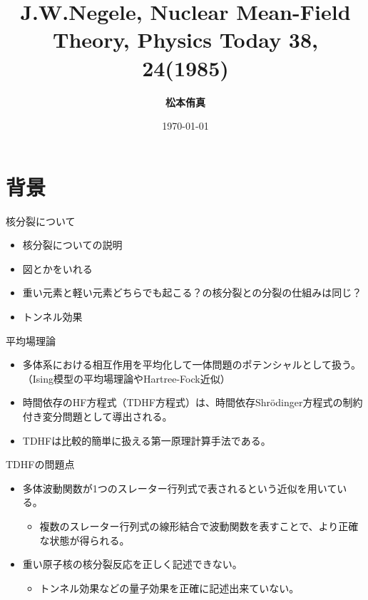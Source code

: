 \documentclass[14pt,aspectratio=169,xcolor=dvipsnames,table,dvipdfmx]{beamer}
\title{J.W.Negele, Nuclear Mean-Field Theory, Physics Today 38, 24(1985)}
\author{\textbf{松本侑真}}
\date{\today}
\institute{}
\theoremstyle{definition}
\begin{document}
\maketitle
\frame{\tableofcontents[hideallsubsections]}

\section{背景}
\begin{frame}{核分裂について}
  \begin{itemize}
    \item 核分裂についての説明
    \item 図とかをいれる
    \item 重い元素と軽い元素どちらでも起こる？の核分裂との分裂の仕組みは同じ？
    \item トンネル効果
  \end{itemize}
\end{frame}

\begin{frame}{平均場理論}
  \begin{itemize}
    \item 多体系における相互作用を平均化して一体問題のポテンシャルとして扱う。（Ising模型の平均場理論やHartree-Fock近似）
    \item 時間依存のHF方程式（TDHF方程式）は、時間依存Shr\"{o}dinger方程式の制約付き変分問題として導出される。
    \item TDHFは比較的簡単に扱える第一原理計算手法である。
  \end{itemize}
  \begin{block}{TDHFの問題点}
    \begin{itemize}
      \item 多体波動関数が1つのスレーター行列式で表されるという近似を用いている。
            \begin{itemize}
              \item 複数のスレーター行列式の線形結合で波動関数を表すことで、より正確な状態が得られる。
            \end{itemize}
      \item 重い原子核の核分裂反応を正しく記述できない。
            \begin{itemize}
              \item トンネル効果などの量子効果を正確に記述出来ていない。
            \end{itemize}
    \end{itemize}
  \end{block}

\end{frame}
\end{document}
